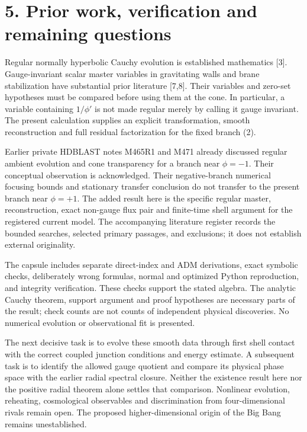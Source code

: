 \documentclass[
  10pt,
]{article}
\begin{document}
\section{5. Prior work, verification and remaining
questions}\label{prior-work-verification-and-remaining-questions}

Regular normally hyperbolic Cauchy evolution is established mathematics
{[}3{]}. Gauge-invariant scalar master variables in gravitating walls
and brane stabilization have substantial prior literature {[}7,8{]}.
Their variables and zero-set hypotheses must be compared before using
them at the cone. In particular, a variable containing \(1/\phi'\) is
not made regular merely by calling it gauge invariant. The present
calculation supplies an explicit transformation, smooth reconstruction
and full residual factorization for the fixed branch (2).

Earlier private HDBLAST notes M465R1 and M471 already discussed regular
ambient evolution and cone transparency for a branch near \(\phi=-1\).
Their conceptual observation is acknowledged. Their negative-branch
numerical focusing bounds and stationary transfer conclusion do not
transfer to the present branch near \(\phi=+1\). The added result here
is the specific regular master, reconstruction, exact non-gauge flux
pair and finite-time shell argument for the registered current model.
The accompanying literature register records the bounded searches,
selected primary passages, and exclusions; it does not establish
external originality.

The capsule includes separate direct-index and ADM derivations, exact
symbolic checks, deliberately wrong formulas, normal and optimized
Python reproduction, and integrity verification. These checks support
the stated algebra. The analytic Cauchy theorem, support argument and
proof hypotheses are necessary parts of the result; check counts are not
counts of independent physical discoveries. No numerical evolution or
observational fit is presented.

The next decisive task is to evolve these smooth data through first
shell contact with the correct coupled junction conditions and energy
estimate. A subsequent task is to identify the allowed gauge quotient
and compare its physical phase space with the earlier radial spectral
closure. Neither the existence result here nor the positive radial
theorem alone settles that comparison. Nonlinear evolution, reheating,
cosmological observables and discrimination from four-dimensional rivals
remain open. The proposed higher-dimensional origin of the Big Bang
remains unestablished.
\end{document}
